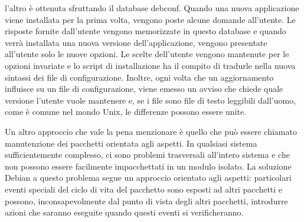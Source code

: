 \documentclass[a4paper,12pt,titlepage,oneside]{book}
\begin{document}
    l'altro è ottenuta sfruttando il database debconf. Quando una nuova applicazione viene installata per la prima volta, vengono poste alcune domande all'utente. Le risposte fornite dall'utente
    vengono memorizzate in questo database e quando verrà installata una nuova versione dell'applicazione, vengono presentate all'utente solo le nuove opzioni.
    Le scelte dell'utente vengono mantenute per le opzioni invariate e lo script di installazione ha il compito di tradurle nella nuova sintassi dei file di configurazione. Inoltre, ogni volta che un aggiornamento influisce su un file di configurazione, 
    viene emesso un avviso che chiede quale versione l'utente vuole mantenere e, se i file sono file di testo leggibili dall'uomo, come è comune nel mondo Unix, le differenze possono essere unite. 

    Un altro approccio che vale la pena menzionare è quello che può essere chiamato manutenzione dei pacchetti orientata agli aspetti.
    In qualsiasi sistema sufficientemente complesso, ci sono problemi trasversali all'intero sistema e che non possono essere facilmente
    impacchettati in un modulo isolato. La soluzione Debian a questo problema segue un approccio orientato agli aspetti: particolari eventi speciali del ciclo di vita del pacchetto sono esposti ad altri
    pacchetti e possono, inconsapevolmente dal punto di vista degli altri pacchetti, introdurre azioni che saranno eseguite quando questi eventi si verificheranno. 
\end{document}
